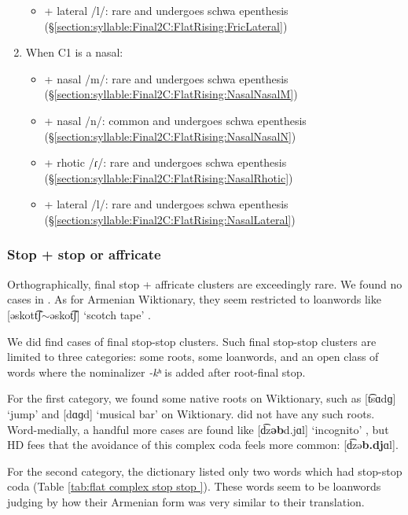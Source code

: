 \begin{enumerate}[noitemsep,topsep=0pt]
\begin{itemize}
			\item  + lateral /l/: rare  and  undergoes schwa epenthesis (\S\ref{section:syllable:Final2C:FlatRising:FricLateral})
		\end{itemize}
		\item When C1 is a nasal:
		\begin{itemize}
			\item  + nasal /m/: rare  and  undergoes schwa epenthesis (\S\ref{section:syllable:Final2C:FlatRising:NasalNasalM})
			\item  + nasal /n/: common  and  undergoes schwa epenthesis (\S\ref{section:syllable:Final2C:FlatRising:NasalNasalN})
			\item  + rhotic /ɾ/: rare  and  undergoes schwa epenthesis (\S\ref{section:syllable:Final2C:FlatRising:NasalRhotic})
			\item  + lateral /l/: rare  and  undergoes schwa epenthesis (\S\ref{section:syllable:Final2C:FlatRising:NasalLateral})
		\end{itemize}
	\end{enumerate}
	\subsubsection{Stop + stop or affricate}\label{section:syllable:Final2C:FlatRising:StopStop}
	Orthographically, final   stop + affricate clusters are exceedingly rare. We found no cases in \citeauthor{kouyoumdjian-1970-DictionaryArmenianEnglish}. As for Armenian Wiktionary, they seem restricted to loanwords like [əskott͡ʃ$\sim$əskot͡ʃ] `scotch tape' .
	
	We did find  cases of final stop-stop clusters. Such final stop-stop clusters  are limited to three categories: some roots, some loanwords, and an open class of words where the nominalizer \textit{-kʰ} is added after root-final stop. 
	
	For the first category, we found some native roots on Wiktionary, such as     [t͡sɑdɡ] `jump'  and [dɑɡd] `musical bar'  on Wiktionary. \citeauthor{kouyoumdjian-1970-DictionaryArmenianEnglish} did not have any such roots.  Word-medially, a handful more cases are found like [d͡z\textbf{əb}d.jɑl] `incognito' , but HD fees that the avoidance of this complex coda feels more common: [d͡zə\textbf{b.dj}ɑl]. 
	
	
	For the second  category,   the \citeauthor{kouyoumdjian-1970-DictionaryArmenianEnglish} dictionary listed only two words which had  stop-stop coda (Table \ref{tab:flat complex stop stop }). These words seem to be loanwords judging by how their Armenian form was very similar to their translation. 
	
